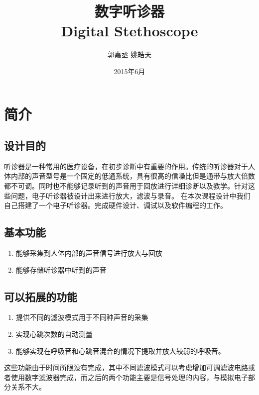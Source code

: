 \documentclass[16pt,a4paper]{article}
\author{郭嘉丞 \quad 姚皓天}
\title{数字听诊器 \\ Digital Stethoscope}
\date{2015年6月}
\begin{document}
\maketitle
\thispagestyle{empty}
\newpage
\section{简介}
\subsection{设计目的}
听诊器是一种常用的医疗设备，在初步诊断中有重要的作用。传统的听诊器对于人体内部的声音型号是一个固定的低通系统，具有很高的信噪比但是通带与放大倍数都不可调。同时也不能够记录听到的声音用于回放进行详细诊断以及教学。针对这些问题，电子听诊器被设计出来进行放大，滤波与录音。\linebreak
在本次课程设计中我们自己搭建了一个电子听诊器。完成硬件设计、调试以及软件编程的工作。
\subsection{基本功能}
\begin{enumerate}
\item 能够采集到人体内部的声音信号进行放大与回放
\item 能够存储听诊器中听到的声音
\end{enumerate}

\subsection{可以拓展的功能}
\begin{enumerate}
\item 提供不同的滤波模式用于不同种声音的采集
\item 实现心跳次数的自动测量
\item 能够实现在呼吸音和心跳音混合的情况下提取并放大较弱的呼吸音。
\end{enumerate}
这些功能由于时间所限没有完成，其中不同滤波模式可以考虑增加可调滤波电路或者使用数字滤波器完成，而之后的两个功能主要是信号处理的内容，与模拟电子部分关系不大。
\end{document}
